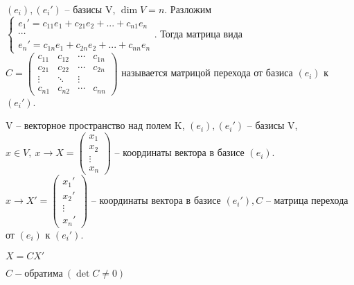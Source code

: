 \begin{Def}
	$(e_i), (e_i')$ -- базисы V, $\dim V = n$. Разложим 
	$\begin{cases}
		e_1' = c_{11}e_1 + c_{21}e_2 + ... + c_{n1}e_n \\ 
		\cdots\\
		e_n' = c_{1n}e_1 + c_{2n}e_2 + ... + c_{nn}e_n
	\end{cases}$. Тогда матрица вида $C = 
	\left(\begin{array}{cccc}
		c_{11} & c_{12} & \cdots & c_{1n} \\ 
		c_{21} & c_{22} & \cdots & c_{2n} \\
		\vdots & \ddots & \vdots \\
		c_{n1} & c_{n2} & \cdots & c_{nn}
		\end{array}\right)$ называется матрицой перехода от базиса $(e_i)$ к $(e_i')$.
\end{Def}

\begin{Thm}
	V -- векторное пространство над полем K, $(e_i), (e_i')$ -- базисы V, $x\in V, \ x \to X = 
	\left(\begin{array}{c}
		x_1 \\ 
		x_2 \\ 
		\vdots \\ 
		x_n
		\end{array}\right) $ -- координаты вектора в базисе $(e_i)$. $x \to X' = 
		\left(\begin{array}{c}
		x_1' \\ 
		x_2' \\ 
		\vdots \\ 
		x_n'
		\end{array}\right)$ -- координаты вектора в базисе $(e_i'), C$ -- матрица перехода от $(e_i)$ к $(e_i')$. 
	\begin{MyList}
		\item $X = CX'$
		\item $C - \text{обратима} \ (\det C \neq 0)$		
	\end{MyList}
\end{Thm}

